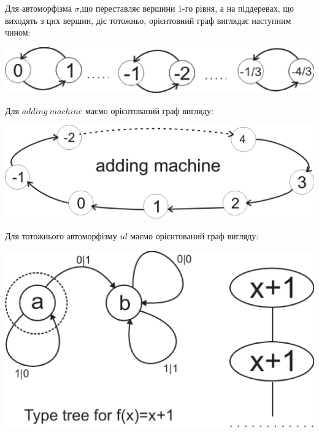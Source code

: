 \documentclass[a4paper,12pt]{article} \usepackage{a4wide}
\numberwithin{equation}{subsection}
\begin{document}
Для автоморфізма $\sigma$,що переставляє вершини 1-го рівня, а на піддеревах, що виходять з цих вершин, діє тотожньо, орієнтовний граф виглядає наступним чином:

\begin{center}
\includegraphics[scale=0.8]{Orsigm.eps}
\end{center}

Для $adding \ machine$ маємо орієнтований граф вигляду:

\begin{center}
\includegraphics[scale=0.4]{Orad.eps}
\end{center}

Для тотожнього автоморфізму $id$ маємо орієнтований граф вигляду:

\begin{center}
\includegraphics[scale=0.6]{auto_arbas_brbb_1.eps}
\end{center}
\end{document}
